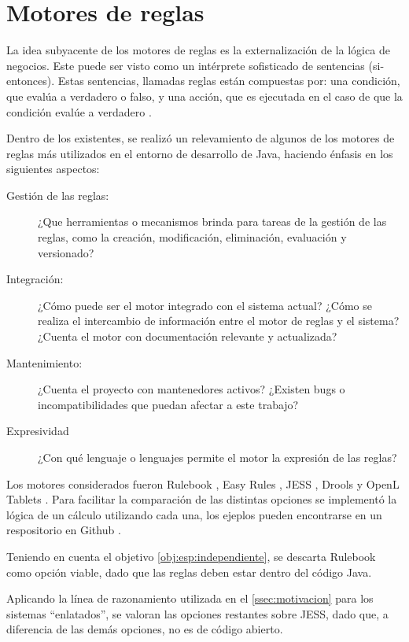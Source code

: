 \section{Motores de reglas}

La idea subyacente de los motores de reglas es la externalización de la lógica de negocios. Este puede ser visto como un intérprete sofisticado de sentencias  (si-entonces). Estas sentencias, llamadas reglas están compuestas por: una condición, que evalúa a verdadero o falso, y una acción, que es ejecutada en el caso de que la condición evalúe a verdadero \cite{qusay2005jsr94}.

Dentro de los existentes, se realizó un relevamiento de algunos de los motores de reglas más utilizados en el entorno de desarrollo de Java, haciendo énfasis en los siguientes aspectos:
\begin{description}
    \item[Gestión de las reglas:] 
    ¿Que herramientas o mecanismos brinda para tareas de la gestión de las reglas, como la creación, modificación, eliminación, evaluación y versionado?
    \item[Integración:]
    ¿Cómo puede ser el motor integrado con el sistema actual? ¿Cómo se realiza el intercambio de información entre el motor de reglas y el sistema? ¿Cuenta el motor con documentación relevante y actualizada?
    \item[Mantenimiento:]
    ¿Cuenta el proyecto con mantenedores activos? ¿Existen bugs o incompatibilidades que puedan afectar a este trabajo?
    \item[Expresividad]
    ¿Con qué lenguaje o lenguajes permite el motor la expresión de las reglas?
\end{description}

Los motores considerados fueron Rulebook \cite{rulebook}, Easy Rules \cite{easy-rules}, JESS \cite{jess}, Drools \cite{drools} y OpenL Tablets \cite{openl-reference}. Para facilitar la comparación de las distintas opciones se implementó la lógica de un cálculo utilizando cada una, los ejeplos pueden encontrarse en un respositorio en Github \cite{ejemplos}.

Teniendo en cuenta el objetivo \ref{obj:esp:independiente}, se descarta Rulebook como opción viable, dado que las reglas deben estar dentro del código Java.

Aplicando la línea de razonamiento utilizada en el \cref{ssec:motivacion} para los sistemas ``enlatados'', se valoran las opciones restantes sobre JESS, dado que, a diferencia de las demás opciones, no es de código abierto.

